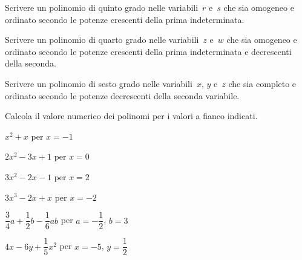 \begin{multicols}{2}
\begin{esercizio}
\label{ese:10.8}
Scrivere un polinomio di quinto grado nelle variabili~\(r\) e~\(s\) che sia omogeneo 
e ordinato secondo le
potenze crescenti della prima indeterminata.
\end{esercizio}

\begin{esercizio}
\label{ese:10.9}
Scrivere un polinomio di quarto grado nelle variabili~\(z\) e~\(w\) che sia omogeneo 
e ordinato secondo le
potenze crescenti della prima indeterminata e decrescenti della seconda.
\end{esercizio}

\begin{esercizio}
\label{ese:10.10}
Scrivere un polinomio di sesto grado nelle variabili~\(x\), \(y\) e~\(z\) che sia 
completo e ordinato secondo le
potenze decrescenti della seconda variabile.
\end{esercizio}

\begin{esercizio}
\label{ese:10.11}
Calcola il valore numerico dei polinomi per i valori a fianco indicati.

\begin{enumeratea}
\item \(x^2+x\) per \(x=-1\)
\item \(2x^2-3x+1\) per \(x=0\)
\item \(3x^2-2x-1\) per \(x=2\)
\item \(3x^3-2x+x\) per \(x=-2\)
\item \(\dfrac{3}{4}a+\dfrac{1}{2}b-\dfrac{1}{6}ab\) per \(a=-\dfrac{1}{2}\), \(b=3\)
\item \(4x-6y+\dfrac{1}{5}x^2\) per \(x=-5\), \(y=\dfrac{1}{2}\)
\end{enumeratea}
\end{esercizio}
\end{multicols}

\subsubsection*{}

